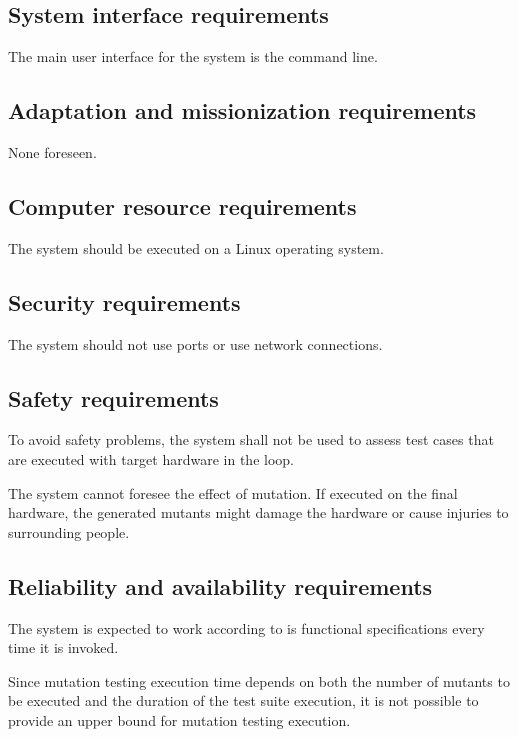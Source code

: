 \subsection{System interface requirements}

\RQ{} The main user interface for the system is the command line.

\subsection{Adaptation and missionization requirements }

None foreseen.

\subsection{Computer resource requirements}

\RQ{} The system should be executed on a Linux operating system.

\subsection{Security requirements }

\RQ{} The system should not use ports or use network connections.

\subsection{Safety requirements}

\RQ{} To avoid safety problems, the system shall not be used to assess test cases that are executed with target hardware in the loop.

\RQ{} The system cannot foresee the effect of mutation. If executed on the final hardware, the generated mutants might damage the hardware or cause injuries to surrounding people.

\subsection{Reliability and availability requirements}

\RQ{} The system is expected to work according to is functional specifications every time it is invoked.

\RQ{} Since mutation testing execution time depends on both the number of mutants to be executed and the duration of the test suite execution, it is not possible to provide an upper bound for mutation testing execution.

